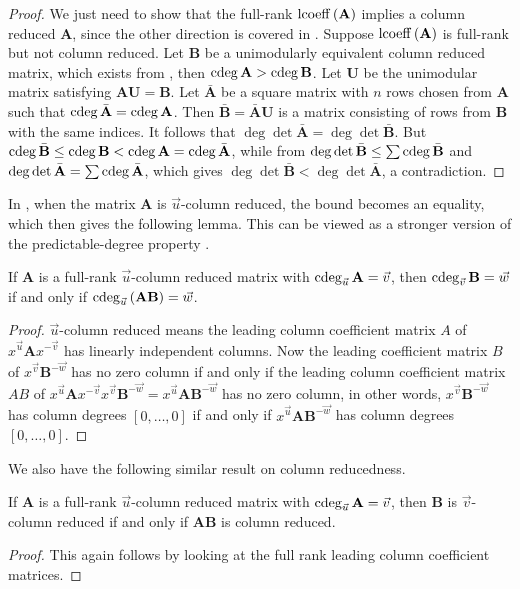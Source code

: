 \begin{proof}
We just need to show that the full-rank $\operatorname{lcoeff}\left(\mathbf{A}\right)$
implies a column reduced $\mathbf{A}$, since the other direction
is covered in . Suppose
$\operatorname{lcoeff}\left(\mathbf{A}\right)$ is full-rank but not column reduced.
Let $\mathbf{B}$ be a unimodularly equivalent column reduced matrix,
which exists from ,
then $\cdeg\mathbf{A}>\cdeg\mathbf{B}$. Let $\mathbf{U}$ be the
unimodular matrix satisfying $\mathbf{A}\mathbf{U}=\mathbf{B}$. Let
$\bar{\mathbf{A}}$ be a square matrix with $n$ rows chosen from
$\mathbf{A}$ such that $\cdeg\bar{\mathbf{A}}=\cdeg\mathbf{A}$.
Then $\bar{\mathbf{B}}=\bar{\mathbf{A}}\mathbf{U}$ is a matrix consisting
of rows from $\mathbf{B}$ with the same indices. It follows that
$\deg\det\bar{\mathbf{A}}=\deg\det\bar{\mathbf{B}}$. But $\cdeg\bar{\mathbf{B}}\le\cdeg\mathbf{B}<\cdeg\mathbf{A}=\cdeg\bar{\mathbf{A}}$,
while from 
$\deg\det\bar{\mathbf{B}}\le\sum\cdeg\bar{\mathbf{B}}$ and $\deg\det\bar{\mathbf{A}}=\sum\cdeg\bar{\mathbf{A}}$,
which gives $\deg\det\bar{\mathbf{B}}<\deg\det\bar{\mathbf{A}}$,
a contradiction.
\end{proof}
In , when the matrix $\mathbf{A}$
is $\vec{u}$-column reduced, the bound becomes an equality, which
then gives the following lemma. This can be viewed as a stronger version
of the predictable-degree property \citep{kailath:1980}.
\begin{lem}
\label{lem:predictableDegree}If $\mathbf{A}$ is a full-rank $\vec{u}$-column
reduced matrix with $\cdeg_{\vec{u}}\mathbf{A}=\vec{v}$, then $\cdeg_{\vec{v}}\mathbf{B}=\vec{w}$
if and only if $\cdeg_{\vec{u}}\left(\mathbf{A}\mathbf{B}\right)=\vec{w}$.\end{lem}
\begin{proof}
$\vec{u}$-column reduced means the leading column coefficient matrix
$A$ of $x^{\vec{u}}\mathbf{A}x^{-\vec{v}}$ has linearly independent
columns. Now the leading coefficient matrix $B$ of $x^{\vec{v}}\mathbf{B}^{-\vec{w}}$
has no zero column if and only if the leading column coefficient matrix
$AB$ of $x^{\vec{u}}\mathbf{A}x^{-\vec{v}}x^{\vec{v}}\mathbf{B}^{-\vec{w}}=x^{\vec{u}}\mathbf{A}\mathbf{B}^{-\vec{w}}$
has no zero column, in other words, $x^{\vec{v}}\mathbf{B}^{-\vec{w}}$
has column degrees $\left[0,\dots,0\right]$ if and only if $x^{\vec{u}}\mathbf{A}\mathbf{B}^{-\vec{w}}$
has column degrees $\left[0,\dots,0\right]$.
\end{proof}
We also have the following similar result on column reducedness.
\begin{lem}
\label{lem:predictableColumnReducedness}If $\mathbf{A}$ is a full-rank
$\vec{u}$-column reduced matrix with $\cdeg_{\vec{u}}\mathbf{A}=\vec{v}$,
then $\mathbf{B}$ is $\vec{v}$-column reduced if and only if $\mathbf{A}\mathbf{B}$
is column reduced.\end{lem}
\begin{proof}
This again follows by looking at the full rank leading column coefficient
matrices.
\end{proof}

